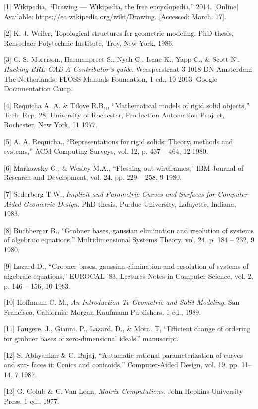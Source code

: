 \documentclass[11pt, oneside]{Thesis} %
\begin{document}
[1] Wikipedia, “Drawing — Wikipedia, the free encyclopedia,” 2014. [Online] Available:
https://en.wikipedia.org/wiki/Drawing. [Accessed: March. 17].

[2] K. J. Weiler, Topological structures for geometric modeling. PhD thesis, Rensselaer
Polytechnic Institute, Troy, New York, 1986.

[3] C. S. Morrison., Harmanpreet S., Nyah C., Isaac K., Yapp C., & Scott N., \textit{Hacking
 BRL-CAD A Contributor’s guide}. Weesperstraat 3 1018 DN Amsterdam The
Netherlands: FLOSS Manuals Foundation, 1 ed., 10 2013. Google Documentation Camp.

[4] Requicha A. A. \& Tilove R.B.,, “Mathematical models of rigid solid objects,” Tech.
Rep. 28, University of Rochester, Production Automation Project, Rochester, New York, 11 1977.

[5] A. A. Requicha., “Representations for rigid solids: Theory, methods and systems,”
ACM Computing Surveys, vol. 12, p. 437 – 464, 12 1980.

[6] Markowsky G., \& Wesley M.A., “Fleshing out wireframes,” IBM Journal of Research
and Development, vol. 24, pp. 229 – 258, 9 1980.

[7] Sederberg T.W., \textit{Implicit and Parametric Curves and Surfaces for Computer Aided
Geometric Design}. PhD thesis, Purdue University, Lafayette, Indiana, 1983.

[8] Buchberger B., “Grobner bases, gaussian elimination and resolution of systems of
algebraic equations,” Multidimensional Systems Theory, vol. 24, p. 184 – 232, 9 1980.

[9] Lazard D., “Grobner bases, gaussian elimination and resolution of systems of algebraic
equations,” EUROCAL ’83, Lectures Notes in Computer Science, vol. 2, p. 146 – 156, 10 1983.

[10] Hoffmann C. M., \textit{An Introduction To Geometric and Solid Modeling}. San Francisco,
California: Morgan Kaufmann Publishers, 1 ed., 1989.

[11] Faugere. J., Gianni. P., Lazard. D., & Mora. T, “Efficient change of ordering for
grobner bases of zero-dimensional ideals.” manuscript.

[12] S. Abhyankar \& C. Bajaj, “Automatic rational parameterization of curves and sur-
faces ii: Conics and conicoids,” Computer-Aided Design, vol. 19, pp. 11–14, 7 1987.

[13] G. Golub \& C. Van Loan, \textit{Matrix Computations}. John Hopkins University Press, 1 ed., 1977.
\end{document}
